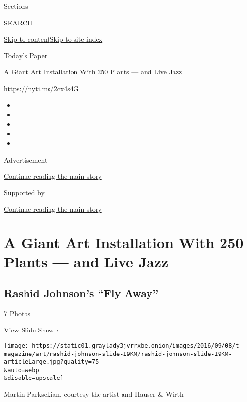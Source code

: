 Sections

SEARCH

\protect\hyperlink{site-content}{Skip to
content}\protect\hyperlink{site-index}{Skip to site index}

\href{https://myaccount.nytimes3xbfgragh.onion/auth/login?response_type=cookie\&client_id=vi}{}

\href{https://www.nytimes3xbfgragh.onion/section/todayspaper}{Today's
Paper}

A Giant Art Installation With 250 Plants --- and Live Jazz

\url{https://nyti.ms/2cx4s4G}

\begin{itemize}
\item
\item
\item
\item
\item
\end{itemize}

Advertisement

\protect\hyperlink{after-top}{Continue reading the main story}

Supported by

\protect\hyperlink{after-sponsor}{Continue reading the main story}

\hypertarget{a-giant-art-installation-with-250-plants--and-live-jazz}{%
\section{A Giant Art Installation With 250 Plants --- and Live
Jazz}\label{a-giant-art-installation-with-250-plants--and-live-jazz}}

\href{https://www.nytimes3xbfgragh.onion/slideshow/2016/09/08/t-magazine/art/rashid-johnsons-fly-away.html}{}

\hypertarget{rashid-johnsons-fly-away}{%
\subsection{Rashid Johnson's ``Fly
Away''}\label{rashid-johnsons-fly-away}}

7 Photos

View Slide Show ›

\texttt{[image: https://static01.graylady3jvrrxbe.onion/images/2016/09/08/t-magazine/art/rashid-johnson-slide-I9KM/rashid-johnson-slide-I9KM-articleLarge.jpg?quality=75\\\&auto=webp\\\&disable=upscale]}

Martin Parksekian, courtesy the artist and Hauser \& Wirth

